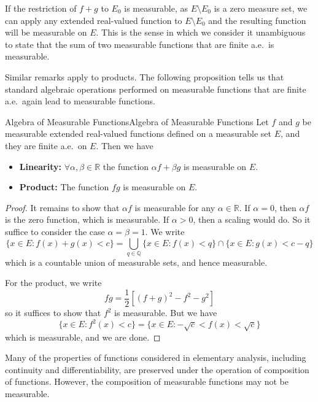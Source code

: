 \documentclass[../main.tex]{subfiles}
\begin{document}
If the restriction of $f+g$ to $E_0$ is measurable, as $E \setminus E_0$ is a zero measure set, we can apply any extended real-valued function to $E \setminus E_0$ and the resulting function will be measurable on $E$. This is the sense in which we consider it unambiguous to state that the sum of two measurable functions that are finite a.e.\ is measurable.

Similar remarks apply to products. The following proposition tells us that standard algebraic operations performed on measurable functions that are finite a.e.\ again lead to measurable functions.

\begin{theorem}{Algebra of Measurable Functions}{Algebra of Measurable Functions}
	Let $f$ and $g$ be measurable extended real-valued functions defined on a measurable set $E$, and they are finite a.e.\ on $E$. Then we have
	\begin{itemize}
		\item \textbf{Linearity:} $\forall \alpha, \beta \in \mathbb{R}$ the function $\alpha f + \beta g$ is measurable on $E$.
		\item \textbf{Product:} The function $fg$ is measurable on $E$.
	\end{itemize}
\end{theorem}
\begin{proof}
	It remains to show that $\alpha f$ is measurable for any $\alpha \in \mathbb{R}$. If $\alpha = 0$, then $\alpha f$ is the zero function, which is measurable. If $\alpha > 0$, then a scaling would do. So it suffice to consider the case $\alpha = \beta = 1$. We write
	\begin{equation}
		\{x \in E : f(x) + g(x) < c\} = \bigcup_{q \in \mathbb{Q}} \{x \in E : f(x) < q\} \cap \{x \in E : g(x) < c - q\}
	\end{equation}
	which is a countable union of measurable sets, and hence measurable.

	For the product, we write
	\begin{equation}
		fg = \frac{1}{2} \left[(f + g)^2 - f^2 - g^2\right]
	\end{equation}
	so it suffices to show that $f^2$ is measurable. But we have
	\begin{equation}
		\{x \in E : f^2(x) < c\} = \{x \in E : -\sqrt{c} < f(x) < \sqrt{c}\}
	\end{equation}
	which is measurable, and we are done.
\end{proof}

Many of the properties of functions considered in elementary analysis, including continuity and differentiability, are preserved under the operation of composition of functions. However, the composition of measurable functions may not be measurable.
\end{document}
